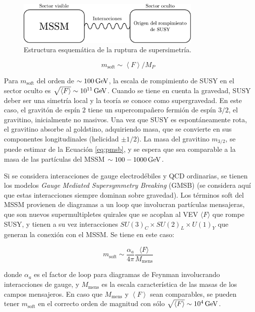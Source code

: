 
\begin{figure}
  \centering
  \includegraphics[width=0.8\textwidth]{images/theory/hidden_sec.pdf}
  \caption{Estructura esquemática de la ruptura de supersimetría.}
  \label{fig:hidden_sector}
\end{figure}

\begin{equation}
m_{\text{soft}} \sim \left< F \right>/M_P
\label{eq:pmsb}
\end{equation}

Para $m_{\text{soft}}$ del orden de $\sim 100\,\text{GeV}$, la escala de rompimiento de SUSY en el sector oculto es $\sqrt{\langle F \rangle}\sim 10^{11}\,\text{GeV}$.
Cuando se tiene en cuenta la gravedad, SUSY deber ser una simetría local y la
teoría se conoce como supergravedad. En este caso, el gravitón de espín $2$ tiene un
supercompañero fermión de espín $3/2$, el gravitino, inicialmente no masivos. Una vez
que SUSY es espontáneamente rota, el gravitino absorbe al goldstino, adquiriendo
masa, que se convierte en sus componentes longitudinales (helicidad $\pm1/2$). La masa
del gravitino $m_{3/2}$, se puede estimar de la Ecuación \ref{eq:pmsb}, y se espera que sea comparable
a la masa de las partículas del MSSM $\sim100-1000\,\text{GeV}$.

Si se considera interacciones de gauge electrodébiles y QCD ordinarias, se tienen
los modelos \textit{Gauge Mediated Supersymmetry Breaking} (GMSB) \cite{gmsb1, gmsb2, gmsb3} (se considera aquí que estas interacciones siempre dominan sobre gravedad). Los términos
soft del MSSM provienen de diagramas a un loop que involucran partículas mensajeras, que son nuevos supermultipletes quirales que se acoplan al VEV $\langle F \rangle$ que
rompe SUSY, y tienen a su vez interacciones $SU(3)_C \times SU(2)_L \times U(1)_Y$ que generan
la conexión con el MSSM. Se tiene en este caso:

\begin{equation}
m_{\text{soft}} \sim \frac{\alpha_a}{4\pi}\frac{\langle F \rangle}{M_\text{mens}}
\label{eq:gmsb}
\end{equation}

\noindent
donde $\alpha_a$ es el factor de loop para diagramas de Feynman involucrando interacciones de gauge, y $M_\text{mens}$ es la escala característica de las masas de los campos mensajeros. En
caso que $M_\text{mens}$ y $\left< F \right>$ sean comparables, se pueden tener $m_{\text{soft}}$ en el correcto
orden de magnitud con sólo $\sqrt{\left< F \right>}\sim 10^4\,\text{GeV}$.

